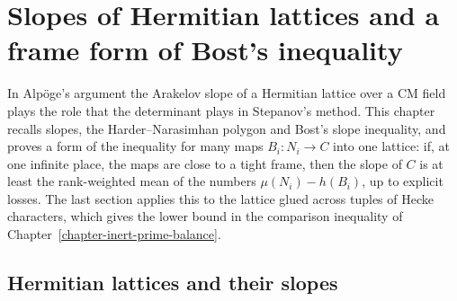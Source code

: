 \chapter{Slopes of Hermitian lattices and a frame form of Bost's inequality}\label{chapter-hermitian-slopes}

In Alpöge's argument the Arakelov slope of a Hermitian lattice over a CM field plays the role
that the determinant plays in Stepanov's method. This chapter recalls slopes, the
Harder--Narasimhan polygon and Bost's slope inequality, and proves a form of the inequality for
many maps $B_i:N_i\to C$ into one lattice: if, at one infinite place, the maps are close to a
tight frame, then the slope of $C$ is at least the rank-weighted mean of the numbers
$\mu(N_i)-h(B_i)$, up to explicit losses. The last section applies this to the lattice glued
across tuples of Hecke characters, which gives the lower bound in the comparison inequality of
Chapter~\ref{chapter-inert-prime-balance}.

\section{Hermitian lattices and their slopes}\label{section-hs-slopes}

